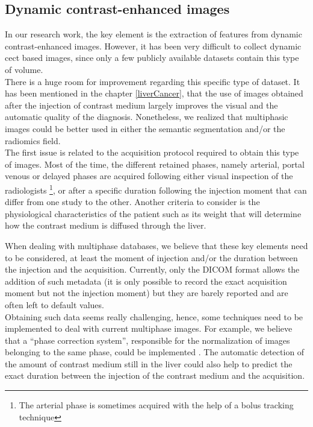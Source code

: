 \subsection{Dynamic contrast-enhanced images}

In our research work, the key element is the extraction of features
from dynamic contrast-enhanced images. However, it has been very
difficult to collect dynamic \ac{cect} based images, since only a few
publicly available datasets contain this type of volume. \\
There is a huge room for improvement regarding this specific type of
dataset. It has been mentioned in the chapter \ref{liverCancer}, that the
use of images obtained after the injection of contrast medium largely
improves the visual and the automatic quality of the diagnosis.
Nonetheless, we realized that multiphasic images could be better used in
either the semantic segmentation and/or the radiomics field.\\
The first issue is related to the acquisition protocol required to
obtain this type of images. Most of the time, the different retained
phases, namely arterial, portal venous or delayed phases are acquired
following either visual inspection of the radiologists \footnote{The arterial phase is sometimes acquired
with the help of a bolus tracking technique}, or after a specific
duration following the injection moment that can differ from one study
to the other. Another criteria to consider is the physiological
characteristics of the patient such as its weight that will determine
how the contrast medium is diffused through the liver.

When dealing with multiphase databases, we believe that these key
elements need to be considered, at least the moment of injection and/or
the duration between the injection and the acquisition.  
Currently, only the DICOM
format allows the addition of such metadata (it is only possible to record 
the exact acquisition moment but not the injection moment) 
but they are barely reported and
are often left to default values.\\
Obtaining such data seems really challenging, hence, some techniques
need to be implemented to deal with current multiphase images. 
For example, we believe that a ``phase correction system'', responsible for 
the normalization of images belonging to the same phase, could be
implemented . The automatic detection of the amount of contrast medium still in
the liver could also help to predict the exact duration between the
injection of the contrast medium and the acquisition.

